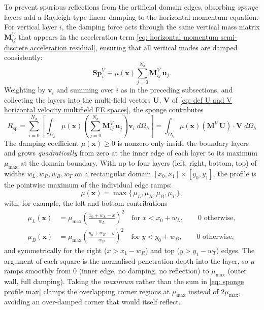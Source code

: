 \documentclass{article}
\newcommand{\Ns}{N_\sigma}
\newcommand{\uj}{\mathbf{u}_j}
\newcommand{\sumj}{\sum_{j=0}^{\Ns}}
\newcommand{\VMij}{\mathbf{M}_{ij}^V}
\newcommand{\VmM}{\mathbf{M}^V}
\newcommand{\vi}{\mathbf{v}_i}
\newcommand{\Oh}{\Omega_h}
\newcommand{\sumi}{\sum_{i=0}^{\Ns}}
\begin{document}
To prevent spurious reflections from the artificial domain edges, absorbing \emph{sponge} layers add a
Rayleigh-type linear damping to the horizontal momentum equation. For vertical layer $i$, the damping
force acts through the same vertical mass matrix $\VMij$ that appears in the acceleration term
\eqref{eq: horizontal momentum semi-discrete acceleration residual}, ensuring that all vertical modes
are damped consistently:
\begin{equation}
    \mathbf{Sp}_i^V \equiv \mu(\mathbf{x})\sumj \VMij\,\uj .
    \label{eq: sponge semi-discrete term}
\end{equation}
Weighting by $\vi$ and summing over $i$ as in the preceding subsections, and collecting the layers into the
multi-field vectors $\mathbf{U}$, $\mathbf{V}$ of
\eqref{eq: def U and V horizontal velocity multifield FE spaces}, the sponge contributes
\begin{equation}
    \boxed{\; R_{\text{sp}} = \sumi\left[\int_{\Oh}\mu(\mathbf{x})\left(\sumj\VMij\,\uj\right)\vi\;d\Oh\right] = \int_{\Oh}\mu(\mathbf{x})\left(\VmM\,\mathbf{U}\right)\cdot\mathbf{V}\;d\Oh \;}
    \label{eq: sponge residual contribution}
\end{equation}
The damping coefficient $\mu(\mathbf{x})\ge0$ is nonzero only inside the boundary layers and grows
\emph{quadratically} from zero at the inner edge of each layer to its maximum $\mu_{\max}$ at the
domain boundary. With up to four layers (left, right, bottom, top) of widths $w_L, w_R, w_B, w_T$ on a
rectangular domain $[x_0,x_1]\times[y_0,y_1]$, the profile is the pointwise maximum of the individual
edge ramps:
\begin{equation}
    \mu(\mathbf{x}) = \max\Big\{\, \mu_L, \mu_R, \mu_B, \mu_T \,\Big\},
    \label{eq: sponge profile max}
\end{equation}
with, for example, the left and bottom contributions
\begin{align}
    \mu_L(\mathbf{x}) &= \mu_{\max}\left(\frac{x_0 + w_L - x}{w_L}\right)^{2}
        \quad\text{for } x < x_0 + w_L, \qquad 0 \text{ otherwise}, \label{eq: sponge left}\\[1mm]
    \mu_B(\mathbf{x}) &= \mu_{\max}\left(\frac{y_0 + w_B - y}{w_B}\right)^{2}
        \quad\text{for } y < y_0 + w_B, \qquad 0 \text{ otherwise}, \label{eq: sponge bottom}
\end{align}
and symmetrically for the right ($x > x_1 - w_R$) and top ($y > y_1 - w_T$) edges. The argument of
each square is the normalised penetration depth into the layer, so $\mu$ ramps smoothly from $0$
(inner edge, no damping, no reflection) to $\mu_{\max}$ (outer wall, full damping). Taking the
\emph{maximum} rather than the sum in \eqref{eq: sponge profile max} clamps the overlapping corner
regions at $\mu_{\max}$ instead of $2\mu_{\max}$, avoiding an over-damped corner that would itself
reflect.
\end{document}
